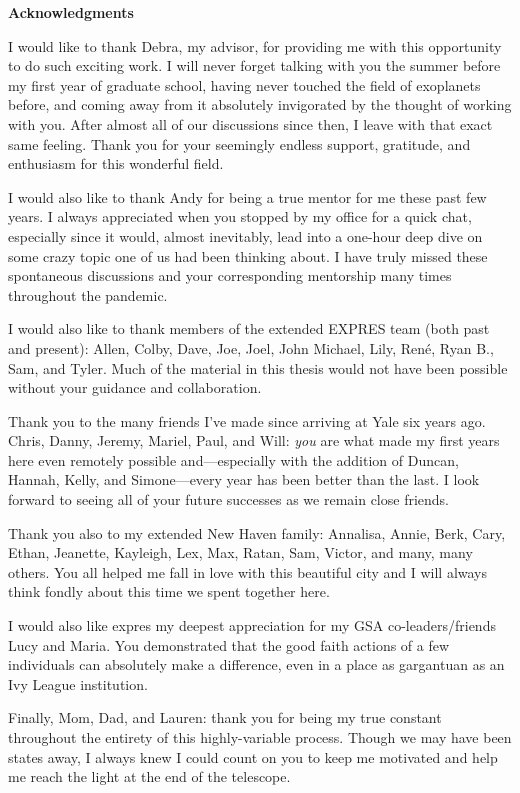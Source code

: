 \begin{center}
{\bf \large Acknowledgments}
\end{center}

I would like to thank Debra, my advisor, for providing me with this opportunity to do such exciting work. I will never forget talking with you the summer before my first year of graduate school, having never touched the field of exoplanets before, and coming away from it absolutely invigorated by the thought of working with you. After almost all of our discussions since then, I leave with that exact same feeling. Thank you for your seemingly endless support, gratitude, and enthusiasm for this wonderful field.

I would also like to thank Andy for being a true mentor for me these past few years. I always appreciated when you stopped by my office for a quick chat, especially since it would, almost inevitably, lead into a one-hour deep dive on some crazy topic one of us had been thinking about. I have truly missed these spontaneous discussions and your corresponding mentorship many times throughout the pandemic.

I would also like to thank members of the extended EXPRES team (both past and present): Allen, Colby, Dave, Joe, Joel, John Michael, Lily, Ren\'e, Ryan B., Sam, and Tyler. Much of the material in this thesis would not have been possible without your guidance and collaboration.

Thank you to the many friends I've made since arriving at Yale six years ago. Chris, Danny, Jeremy, Mariel, Paul, and Will: \textit{you} are what made my first years here even remotely possible and---especially with the addition of Duncan, Hannah, Kelly, and Simone---every year has been better than the last. I look forward to seeing all of your future successes as we remain close friends.

Thank you also to my extended New Haven family: Annalisa, Annie, Berk, Cary, Ethan, Jeanette, Kayleigh, Lex, Max, Ratan, Sam, Victor, and many, many others. You all helped me fall in love with this beautiful city and I will always think fondly about this time we spent together here.

I would also like expres my deepest appreciation for my GSA co-leaders/friends Lucy and Maria. You demonstrated that the good faith actions of a few individuals can absolutely make a difference, even in a place as gargantuan as an Ivy League institution.

Finally, Mom, Dad, and Lauren: thank you for being my true constant throughout the entirety of this highly-variable process. Though we may have been states away, I always knew I could count on you to keep me motivated and help me reach the light at the end of the telescope.